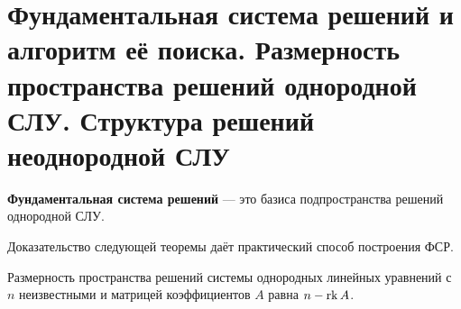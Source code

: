 \section{Фундаментальная система решений и алгоритм её поиска. Размерность пространства решений однородной СЛУ. Структура решений неоднородной СЛУ}

\begin{definition}
    \textbf{Фундаментальная система решений} --- это базиса подпространства решений однородной СЛУ.
\end{definition}

\begin{remark}
    Доказательство следующей теоремы даёт практический способ построения ФСР.
\end{remark}

\begin{theorem}
    Размерность пространства решений системы однородных линейных уравнений с $n$ неизвестными и матрицей коэффициентов $A$ равна $n - \mathrm{rk}\, A$.
\end{theorem}

